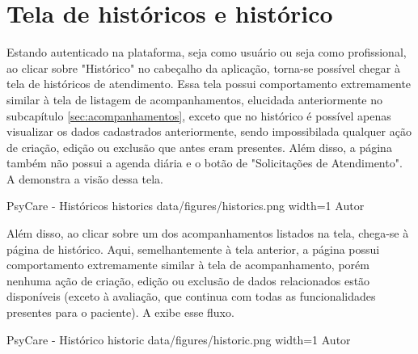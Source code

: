 \section{Tela de históricos e histórico}
\label{sec:historicos}

Estando autenticado na plataforma, seja como usuário ou seja como profissional, ao clicar sobre "Histórico" no cabeçalho da aplicação, torna-se possível chegar à tela de históricos de atendimento. Essa tela possui comportamento extremamente similar à tela de listagem de acompanhamentos, elucidada anteriormente no subcapítulo \ref{sec:acompanhamentos}, exceto que no histórico é possível apenas visualizar os dados cadastrados anteriormente, sendo impossibilada qualquer ação de criação, edição ou exclusão que antes eram presentes. Além disso, a página também não possui a agenda diária e o botão de "Solicitações de Atendimento". A  demonstra a visão dessa tela.

\image
    {PsyCare - Históricos}
    {historics}
    {data/figures/historics.png}
    {width=1\textwidth}
    {Autor}

Além disso, ao clicar sobre um dos acompanhamentos listados na tela, chega-se à página de histórico. Aqui, semelhantemente à tela anterior, a página possui comportamento extremamente similar à tela de acompanhamento, porém nenhuma ação de criação, edição ou exclusão de dados relacionados estão disponíveis (exceto à avaliação, que continua com todas as funcionalidades presentes para o paciente). A  exibe esse fluxo.

\image
    {PsyCare - Histórico}
    {historic}
    {data/figures/historic.png}
    {width=1\textwidth}
    {Autor}